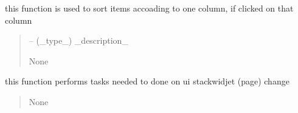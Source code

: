 \documentclass[letterpaper,10pt,english]{sphinxmanual}
\begin{document}
\begin{savenotes}
\begin{fulllineitems}

\begin{savenotes}\begin{fulllineitems}
\label{\detokenize{setting/setting_api:oxin.setting_api.API.tabledefects_onHeaderClicked}}
\pysigstartsignatures
{}
\pysigstopsignatures
\sphinxAtStartPar
this function is used to sort items accoading to one column, if clicked on that column
\begin{quote}\begin{description}
\sphinxAtStartPar
{} – (\_type\_) \_description\_

\sphinxAtStartPar
None

\end{description}\end{quote}

\end{fulllineitems}\end{savenotes}


\begin{savenotes}\begin{fulllineitems}
\label{\detokenize{setting/setting_api:oxin.setting_api.API.things_to_do_on_stackwidject_change}}
\pysigstartsignatures
{}
\pysigstopsignatures
\sphinxAtStartPar
this function performs tasks needed to done on ui stackwidjet (page) change
\begin{quote}\begin{description}
\sphinxAtStartPar
None

\end{description}\end{quote}

\end{fulllineitems}\end{savenotes}



\end{fulllineitems}
\end{savenotes}
\end{document}
